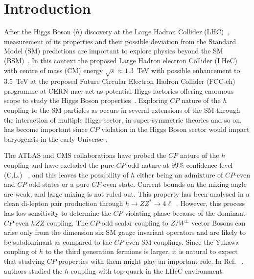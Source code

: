 \documentclass[pdftex,twocolumn,epjc3]{svjour3}          %
\begin{document}
\section{Introduction}
\label{intro}
After the Higgs Boson ($h$) discovery at the Large Hadron Collider (LHC)~\cite{ATLAS:2013xga, ATLAS:2012yve, CMS:2012qbp, ATLAS:2013dos}, measurement of its properties and their possible deviation from the Standard Model (SM) predictions are important to explore physics beyond the SM (BSM)~\cite{CMS:2020dkv}. In this context the proposed Large Hadron electron Collider (LHeC)~\cite{AbelleiraFernandez:2012cc,Bruening:2013bga,LHeC:2020van, FCC:2018byv} with centre of mass (CM) energy $\sqrt{s} \approx 1.3$~TeV with possible enhancement to 3.5~TeV at the proposed Future Circular Electron Hadron Collider  (FCC-eh) programme at CERN may act as potential Higgs factories offering enormous scope to study the Higgs Boson properties~\cite{Biswal:2012mp,Kumar:2015kca,Coleppa:2017rgb}. Exploring $CP$ nature of the $h$ coupling to the SM particles as occurs in several extensions of the SM through the interaction of multiple Higgs-sector, in super-symmetric theories and so on, has become important since $CP$ violation in the Higgs Boson sector would impact baryogensis in the early Universe  \cite{Ge:2020mcl,Basler:2017uxn,Bernlochner:2018opw,Shu:2013uua,Chiang:2016vgf}. 

\par The ATLAS and CMS collaborations have probed the $CP$ nature of the $h$ coupling and have excluded the pure $CP$ odd nature at 99\% confidence level (C.L.)   ~\cite{CMS:2012vby, CMS:2013fjq, CMS:2014nkk, CMS:2016tad}, and this leaves the possibility of $h$ either being an admixture of $CP$-even and $CP$-odd states or a pure $CP$-even state. Current bounds on the mixing angle are weak, and large mixing is not ruled out. This property has been analysed in a clean di-lepton pair production through $h \to Z Z^* \to 4 \ell $~\cite{Chen:2014gka, Bishara:2013vya, Korchin:2013ifa, Chen:2014ona}. However, this process has low sensitivity to determine the $CP$ violating phase because of the dominant $CP$ even $hZZ$ coupling. The $CP$-odd scalar coupling to $Z/W^\pm$ vector Bosons can arise only from the dimension six SM gauge invariant operators and are likely to be subdominant as compared to the $CP$-even SM couplings. Since the Yukawa coupling of $h$ to the third generation fermions is larger, it is natural to expect that studying $CP$ properties with them might play an important role. In Ref.   ~\cite{Coleppa:2017rgb}, authors studied the $h$ coupling with top-quark in the LHeC environment. 
\end{document}
